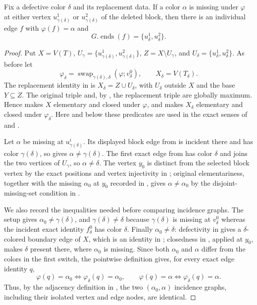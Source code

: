 \begin{helper}
Fix a defective color $\delta$ and its replacement data.  If a color
$\alpha$ is missing under $\varphi$ at either vertex
$u^1_{\gamma(\delta)}$ or $u^2_{\gamma(\delta)}$ of the deleted block, then
there is an individual edge $f$ with $\varphi(f)=\alpha$ and
\[
 G.\operatorname{ends}(f)=\{u^1_\delta,u^2_\delta\}.
\]
\end{helper}
\begin{proof}
Put $X=V(T)$,
$U_\gamma=\{u^1_{\gamma(\delta)},u^2_{\gamma(\delta)}\}$,
$Z=X\setminus U_\gamma$, and
$U_\delta=\{u^1_\delta,u^2_\delta\}$.  As before let
\[
 \varphi_\delta=\operatorname{swap}_{\gamma(\delta),\delta}
   (\varphi;v^0_\delta),\qquad X_\delta=V(T_\delta).
\]
The replacement identity in  is
$X_\delta=Z\cup U_\delta$, with $U_\delta$ outside $X$ and the base
$Y\subseteq Z$.  The original triple and, by
, the replacement triple are globally
maximum.  Hence  makes $X$ elementary
and closed under $\varphi$, and makes $X_\delta$ elementary and closed under
$\varphi_\delta$.  Here and below these predicates are used in the exact
senses of  and
.

Let $\alpha$ be missing at $u^i_{\gamma(\delta)}$.  Its displayed block edge
from  is incident there and has
color $\gamma(\delta)$, so  gives
$\alpha\ne\gamma(\delta)$.  The first exact edge from
 has color $\delta$ and joins the
two vertices of $U_\gamma$, so $\alpha\ne\delta$.  The vertex $y_0$ is
distinct from the selected block vertex by the exact positions and vertex
injectivity in ; original elementariness, together
with the missing $\alpha_0$ at $y_0$ recorded in
, gives $\alpha\ne\alpha_0$ by the
disjoint-missing-set condition in .

We also record the inequalities needed before comparing incidence graphs.
The setup gives $\alpha_0\ne\gamma(\delta)$, and
$\gamma(\delta)\ne\delta$ because $\gamma(\delta)$ is missing at
$v^0_\delta$ whereas the incident exact identity $f^0_\delta$ has color
$\delta$.  Finally $\alpha_0\ne\delta$: defectivity in
 gives a $\delta$-colored boundary edge of $X$,
which is an identity in ; closedness in
, applied at $y_0$, makes $\delta$ present
there, where $\alpha_0$ is missing.  Since both $\alpha_0$ and $\alpha$
differ from the colors in the
first switch, the pointwise definition
 gives, for every exact edge identity $q$,
\[
 \varphi(q)=\alpha_0\Longleftrightarrow
 \varphi_\delta(q)=\alpha_0,
 \qquad
 \varphi(q)=\alpha\Longleftrightarrow
 \varphi_\delta(q)=\alpha.                                  \tag{1}
\]
Thus, by the adjacency definition in , the
two $(\alpha_0,\alpha)$ incidence graphs, including their isolated vertex
and edge nodes, are identical.


\end{proof}
